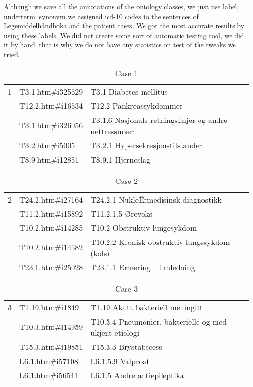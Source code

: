 Although we save all the annotations of the ontology classes, we just use label,
underterm, synonym we assigned icd-10 codes to the sentences of
Legemiddelhåndboka and the patient cases. We got the most accurate results by
using these labels. We did not create some sort of automatic testing tool, we
did it by hand, that is why we do not have any statistics on test of the tweaks
we tried.
\newpage
\begin{table}[htbp]\centering\footnotesize
\caption{Case 1}
\begin{tabular}{cll}
\toprule
1 & T3.1.htm\#i325629  & T3.1 Diabetes mellitus \\
  & T12.2.htm\#i16634  & T12.2 Pankreassykdommer \\
  & T3.1.htm\#i326056  & T3.1.6 Nasjonale retningslinjer og andre nettressurser \\
  & T3.2.htm\#i5005    & T3.2.1 Hypersekresjonstilstander \\
  & T8.9.htm\#i12851   & T8.9.1 Hjerneslag \\
\bottomrule
\end{tabular}
\end{table}
\begin{table}[htbp]\centering\footnotesize
\caption{Case 2}
\begin{tabular}{cll}
\toprule
2 & T24.2.htm\#i27164  & T24.2.1 NukleÊrmedisinsk diagnostikk \\
  & T11.2.htm\#i15892  & T11.2.1.5 Ørevoks \\
  & T10.2.htm\#i14285  & T10.2  Obstruktiv lungesykdom \\
  & T10.2.htm\#i14682  & T10.2.2 Kronisk obstruktiv lungesykdom (kols) \\
  & T23.1.htm\#i25028  & T23.1.1 Ernæring – innledning \\
\bottomrule
\end{tabular}
\end{table}
\begin{table}[htbp]\centering\footnotesize
\caption{Case 3}
\begin{tabular}{cll}
\toprule
3 & T1.10.htm\#i1849   & T1.10 Akutt bakteriell meningitt \\
  & T10.3.htm\#i14959  & T10.3.4  Pneumonier, bakterielle og med ukjent etiologi \\
  & T15.3.htm\#i19851  & T15.3.3 Brystabscess \\
  & L6.1.htm\#i57108   & L6.1.5.9 Valproat \\
  & L6.1.htm\#i56541   & L6.1.5 Andre antiepileptika \\
\bottomrule
\end{tabular}
\end{table}
